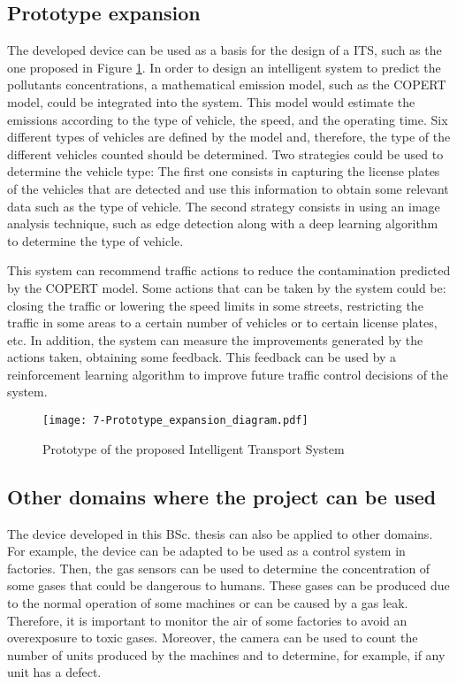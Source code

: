 \subsection{Prototype expansion}
The developed device can be used as a basis for the design of a \ac{ITS}, such as the one proposed in Figure \ref{fig:7-Prototype_expansion_diagram}. In order to design an intelligent system to predict the pollutants concentrations, a mathematical emission model, such as the COPERT \cite{NS16} model, could be integrated into the system. This model would estimate the emissions according to the type of vehicle, the speed, and the operating time. Six different types of vehicles are defined by the model and, therefore, the type of the different vehicles counted should be determined. Two strategies could be used to determine the vehicle type: The first one consists in capturing the license plates of the vehicles that are detected and use this information to obtain some relevant data such as the type of vehicle. The second strategy consists in using an image analysis technique, such as edge detection along with a deep learning algorithm to determine the type of vehicle.

This system can recommend traffic actions to reduce the contamination predicted by the COPERT model. Some actions that can be taken by the system could be: closing the traffic or lowering the speed limits in some streets, restricting the traffic in some areas to a certain number of vehicles or to certain license plates, etc. In addition, the system can measure the improvements generated by the actions taken, obtaining some feedback. This feedback can be used by a reinforcement learning algorithm to improve future traffic control decisions of the system.

\begin{figure}[!h]
	\begin{center}
		\texttt{[image: 7-Prototype\_expansion\_diagram.pdf]}
		\caption{Prototype of the proposed Intelligent Transport System}
		\label{fig:7-Prototype_expansion_diagram}
	\end{center}
\end{figure}


\subsection{Other domains where the project can be used}
The device developed in this \ac{BSc.} thesis can also be applied to other domains. For example, the device can be adapted to be used as a control system in factories. Then, the gas sensors can be used to determine the concentration of some gases that could be dangerous to humans. These gases can be produced due to the normal operation of some machines or can be caused by a gas leak. Therefore, it is important to monitor the air of some factories to avoid an overexposure to toxic gases. Moreover, the camera can be used to count the number of units produced by the machines and to determine, for example, if any unit has a defect.

